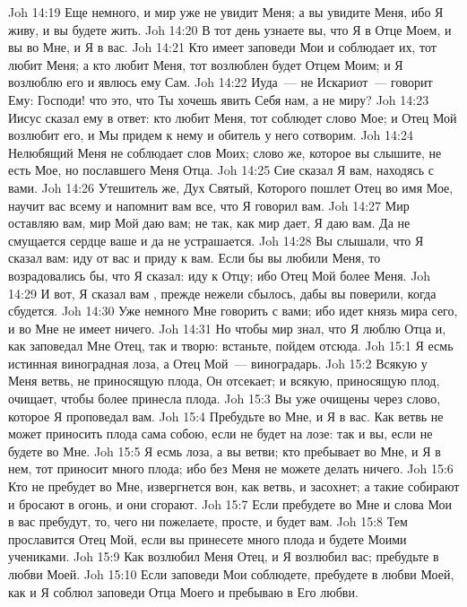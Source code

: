 \vs Joh 14:19 Еще немного, и мир уже не увидит Меня; а вы увидите Меня, ибо Я живу, и вы будете жить.
\vs Joh 14:20 В тот день узнаете вы, что Я в Отце Моем, и вы во Мне, и Я в вас.
\vs Joh 14:21 Кто имеет заповеди Мои и соблюдает их, тот любит Меня; а кто любит Меня, тот возлюблен будет Отцем Моим; и Я возлюблю его и явлюсь ему Сам.
\vs Joh 14:22 Иуда~--- не Искариот~--- говорит Ему: Господи! что это, что Ты хочешь явить Себя нам, а не миру?
\vs Joh 14:23 Иисус сказал ему в ответ: кто любит Меня, тот соблюдет слово Мое; и Отец Мой возлюбит его, и Мы придем к нему и обитель у него сотворим.
\vs Joh 14:24 Нелюбящий Меня не соблюдает слов Моих; слово же, которое вы слышите, не есть Мое, но пославшего Меня Отца.
\vs Joh 14:25 Сие сказал Я вам, находясь с вами.
\vs Joh 14:26 Утешитель же, Дух Святый, Которого пошлет Отец во имя Мое, научит вас всему и напомнит вам все, что Я говорил вам.
\vs Joh 14:27 Мир оставляю вам, мир Мой даю вам; не так, как мир дает, Я даю вам. Да не смущается сердце ваше и да не устрашается.
\vs Joh 14:28 Вы слышали, что Я сказал вам: иду от вас и приду к вам. Если бы вы любили Меня, то возрадовались бы, что Я сказал: иду к Отцу; ибо Отец Мой более Меня.
\vs Joh 14:29 И вот, Я сказал вам , прежде нежели сбылось, дабы вы поверили, когда сбудется.
\vs Joh 14:30 Уже немного Мне говорить с вами; ибо идет князь мира сего, и во Мне не имеет ничего.
\vs Joh 14:31 Но чтобы мир знал, что Я люблю Отца и, как заповедал Мне Отец, так и творю: встаньте, пойдем отсюда.
\vs Joh 15:1 Я есмь истинная виноградная лоза, а Отец Мой~--- виноградарь.
\vs Joh 15:2 Всякую у Меня ветвь, не приносящую плода, Он отсекает; и всякую, приносящую плод, очищает, чтобы более принесла плода.
\vs Joh 15:3 Вы уже очищены через слово, которое Я проповедал вам.
\vs Joh 15:4 Пребудьте во Мне, и Я в вас. Как ветвь не может приносить плода сама собою, если не будет на лозе: так и вы, если не будете во Мне.
\vs Joh 15:5 Я есмь лоза, а вы ветви; кто пребывает во Мне, и Я в нем, тот приносит много плода; ибо без Меня не можете делать ничего.
\vs Joh 15:6 Кто не пребудет во Мне, извергнется вон, как ветвь, и засохнет; а такие  собирают и бросают в огонь, и они сгорают.
\vs Joh 15:7 Если пребудете во Мне и слова Мои в вас пребудут, то, чего ни пожелаете, просте, и будет вам.
\vs Joh 15:8 Тем прославится Отец Мой, если вы принесете много плода и будете Моими учениками.
\vs Joh 15:9 Как возлюбил Меня Отец, и Я возлюбил вас; пребудьте в любви Моей.
\vs Joh 15:10 Если заповеди Мои соблюдете, пребудете в любви Моей, как и Я соблюл заповеди Отца Моего и пребываю в Его любви.
